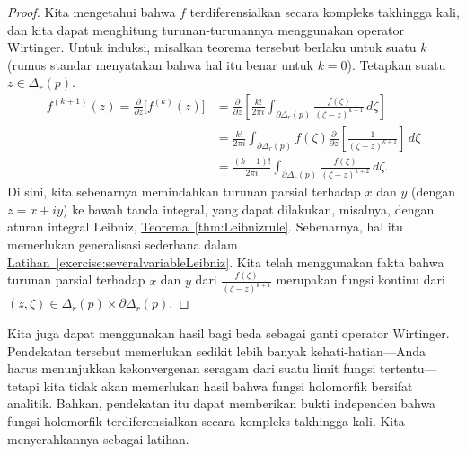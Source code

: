 \documentclass[12pt,openany]{book}
\theoremstyle{plain}
\theoremstyle{remark}
\theoremstyle{definition}
\theoremstyle{exercise}
\theoremstyle{example}
\newcommand{\exerciseref}[1]{\hyperref[#1]{Latihan~\ref*{#1}}}
\newcommand{\thmref}[1]{\hyperref[#1]{Teorema~\ref*{#1}}}
\begin{document}
\begin{proof}
Kita mengetahui bahwa $f$ terdiferensialkan secara kompleks takhingga kali, dan kita dapat menghitung
turunan-turunannya menggunakan operator Wirtinger.
Untuk induksi, misalkan teorema tersebut berlaku untuk suatu $k$
(rumus standar menyatakan bahwa hal itu benar untuk $k=0$).  Tetapkan suatu $z \in
\Delta_r(p)$.
\begin{equation*}
\begin{split}
f^{(k+1)}(z)
=
\frac{\partial }{\partial z}
\bigl[ f^{(k)}(z) \bigr]
& =
\frac{\partial }{\partial z}
\left[
\frac{k!}{2\pi i}
\int_{\partial \Delta_r(p)}
\frac{f(\zeta)}{(\zeta-z)^{k+1}}
\,
d \zeta
\right]
\\
& = 
\frac{k!}{2\pi i}
\int_{\partial \Delta_r(p)}
f(\zeta)
\frac{\partial }{\partial z}
\left[
\frac{1}{(\zeta-z)^{k+1}}
\right]
\,
d \zeta
\\
& = 
\frac{(k+1)!}{2\pi i}
\int_{\partial \Delta_r(p)}
\frac{f(\zeta)}{(\zeta-z)^{k+2}}
\,
d \zeta .
\end{split}
\end{equation*}
Di sini, kita sebenarnya memindahkan turunan parsial terhadap $x$ dan $y$ (dengan $z=x+iy$)
ke bawah tanda integral,
yang dapat dilakukan, misalnya, dengan 
aturan integral Leibniz, \thmref{thm:Leibnizrule}.
Sebenarnya, hal itu memerlukan generalisasi sederhana dalam
\exerciseref{exercise:severalvariableLeibniz}.
Kita telah menggunakan fakta bahwa
turunan parsial terhadap $x$ dan $y$ dari 
$\frac{f(\zeta)}{(\zeta-z)^{k+1}}$ merupakan fungsi kontinu
dari $(z,\zeta) \in \Delta_r(p) \times \partial \Delta_r(p)$.
\end{proof}

Kita juga dapat menggunakan hasil bagi beda sebagai ganti
operator Wirtinger.  Pendekatan tersebut memerlukan sedikit lebih banyak kehati-hatian---Anda harus menunjukkan
kekonvergenan seragam dari suatu limit fungsi tertentu---tetapi kita
tidak akan memerlukan hasil
bahwa fungsi holomorfik bersifat analitik.  Bahkan,
pendekatan itu dapat memberikan bukti independen bahwa fungsi holomorfik terdiferensialkan secara kompleks
takhingga kali.
Kita menyerahkannya sebagai latihan.
\end{document}
